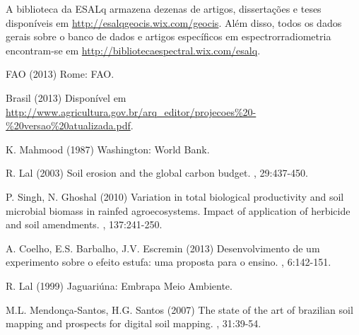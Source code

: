 A biblioteca da ESALq armazena dezenas de artigos, dissertações e teses disponíveis em \url{http://esalqgeocis.wix.com/geocis}. Além disso, todos os dados gerais sobre o banco de dados e artigos específicos em espectrorradiometria encontram-se em \url{http://bibliotecaespectral.wix.com/esalq}.

\begin{footnotesize}
\begin{thebibliography}{99}

FAO (2013)
\newblock Rome: FAO.

Brasil (2013)
\newblock Disponível em \url{http://www.agricultura.gov.br/arq\_editor/projecoes\%20-\%20versao\%20atualizada.pdf}.

K. Mahmood (1987)
\newblock Washington: World Bank.

R. Lal (2003)
\newblock Soil erosion and the global carbon budget.
, 29:437-450.

P. Singh, N. Ghoshal (2010)
\newblock Variation in total biological productivity and soil microbial biomass in rainfed agroecosystems. Impact of application of herbicide and soil amendments.
, 137:241-250.

A. Coelho, E.S. Barbalho, J.V. Escremin (2013)
\newblock Desenvolvimento de um experimento sobre o efeito estufa: uma proposta para o ensino.
, 6:142-151.

R. Lal (1999)
\newblock Jaguariúna: Embrapa Meio Ambiente.

M.L. Mendonça-Santos, H.G. Santos (2007)
\newblock The state of the art of brazilian soil mapping and prospects for digital soil mapping.
, 31:39-54.


\end{thebibliography}
\end{footnotesize}

